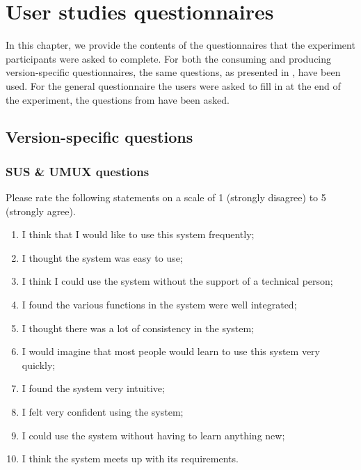 \chapter{User studies questionnaires}

In this chapter, we provide the contents of the questionnaires that the experiment participants were asked to complete. For both the consuming and producing version-specific questionnaires, the same questions, as presented in , have been used. For the general questionnaire the users were asked to fill in at the end of the experiment, the questions from  have been asked.

\section{Version-specific questions}
\subsection*{SUS \& UMUX questions}
Please rate the following statements on a scale of 1 (strongly disagree) to 5 (strongly agree).
\begin{enumerate}
\item I think that I would like to use this system frequently;
\item I thought the system was easy to use;
\item I think I could use the system without the support of a technical person;
\item I found the various functions in the system were well integrated;
\item I thought there was a lot of consistency in the system;
\item I would imagine that most people would learn to use this system very quickly;
\item I found the system very intuitive;
\item I felt very confident using the system;
\item I could use the system without having to learn anything new;
\item I think the system meets up with its requirements.
\end{enumerate}

